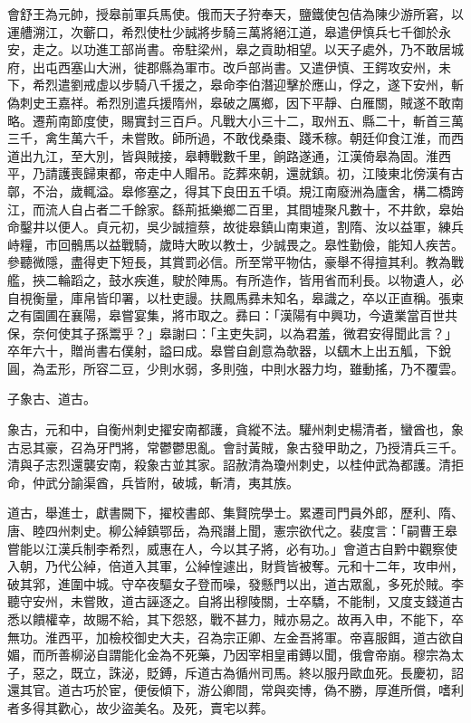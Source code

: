 \begin{pinyinscope}
 會舒王為元帥，授皋前軍兵馬使。俄而天子狩奉天，鹽鐵使包佶為陳少游所窘，以運艚溯江，次蘄口，希烈使杜少誠將步騎三萬將絕江道，皋遣伊慎兵七千御於永安，走之。以功進工部尚書。帝駐梁州，皋之貢助相望。以天子處外，乃不敢居城府，出屯西塞山大洲，徙郡縣為軍市。改戶部尚書。又遣伊慎、王鍔攻安州，未下，希烈遣劉戒虛以步騎八千援之，皋命李伯潛迎擊於應山，俘之，遂下安州，斬偽刺史王嘉祥。希烈別遣兵援隋州，皋破之厲鄉，因下平靜、白雁關，賊遂不敢南略。遷荊南節度使，賜實封三百戶。凡戰大小三十二，取州五、縣二十，斬首三萬三千，禽生萬六千，未嘗敗。師所過，不敢伐桑棗、踐禾稼。朝廷仰食江淮，而西道出九江，至大別，皆與賊接，皋轉戰數千里，餉路遂通，江漢倚皋為固。淮西平，乃請護喪歸東都，帝走中人賵吊。訖葬來朝，還就鎮。初，江陵東北傍漢有古鄣，不治，歲輒溢。皋修塞之，得其下良田五千頃。規江南廢洲為廬舍，構二橋跨江，而流人自占者二千餘家。繇荊抵樂鄉二百里，其間墟聚凡數十，不井飲，皋始命鑿井以便人。貞元初，吳少誠擅蔡，故徙皋鎮山南東道，割隋、汝以益軍，練兵峙糧，市回鶻馬以益戰騎，歲時大畋以教士，少誠畏之。皋性勤儉，能知人疾苦。參聽微隱，盡得吏下短長，其賞罰必信。所至常平物估，豪舉不得擅其利。教為戰艦，挾二輪蹈之，鼓水疾進，駛於陣馬。有所造作，皆用省而利長。以物遺人，必自視衡量，庫帛皆印署，以杜吏謾。扶鳳馬彞未知名，皋識之，卒以正直稱。張柬之有園圃在襄陽，皋嘗宴集，將市取之。彞曰：「漢陽有中興功，今遺業當百世共保，奈何使其子孫鬻乎？」皋謝曰：「主吏失詞，以為君羞，微君安得聞此言？」卒年六十，贈尚書右僕射，謚曰成。皋嘗自創意為欹器，以颻木上出五觚，下銳圓，為盂形，所容二豆，少則水弱，多則強，中則水器力均，雖動搖，乃不覆雲。



 子象古、道古。



 象古，元和中，自衡州刺史擢安南都護，貪縱不法。驩州刺史楊清者，蠻酋也，象古忌其豪，召為牙門將，常鬱鬱思亂。會討黃賊，象古發甲助之，乃授清兵三千。清與子志烈還襲安南，殺象古並其家。詔赦清為瓊州刺史，以桂仲武為都護。清拒命，仲武分諭渠酋，兵皆附，破城，斬清，夷其族。



 道古，舉進士，獻書闕下，擢校書郎、集賢院學士。累遷司門員外郎，歷利、隋、唐、睦四州刺史。柳公綽鎮鄂岳，為飛譖上聞，憲宗欲代之。裴度言：「嗣曹王皋嘗能以江漢兵制李希烈，威惠在人，今以其子將，必有功。」會道古自黔中觀察使入朝，乃代公綽，倍道入其軍，公綽惶遽出，財貲皆被奪。元和十二年，攻申州，破其郛，進圍中城。守卒夜驅女子登而噪，發懸門以出，道古眾亂，多死於賊。李聽守安州，未嘗敗，道古誣逐之。自將出穆陵關，士卒驕，不能制，又度支錢道古悉以饋權幸，故賜不給，其下怨怒，戰不甚力，賊亦易之。故再入申，不能下，卒無功。淮西平，加檢校御史大夫，召為宗正卿、左金吾將軍。帝喜服餌，道古欲自媚，而所善柳泌自謂能化金為不死藥，乃因宰相皇甫鎛以聞，俄會帝崩。穆宗為太子，惡之，既立，誅泌，貶鎛，斥道古為循州司馬。終以服丹歐血死。長慶初，詔還其官。道古巧於宦，便佞傾下，游公卿間，常與奕博，偽不勝，厚進所償，嗜利者多得其歡心，故少盜美名。及死，賣宅以葬。



\end{pinyinscope}